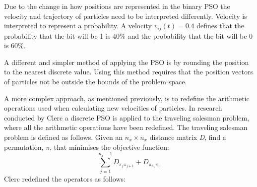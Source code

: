 Due to the change in how positions are represented in the binary \gls{PSO} the velocity and trajectory of particles need to be interpreted differently\cite{CompuIntelligenceIntro,FundamentalSwarm}. Velocity is interpreted to represent a probability. A velocity $v_{ij}(t)= 0.4$ defines that the probability that the bit will be 1 is 40\% and the probability that the bit will be 0 is 60\%\cite{CompuIntelligenceIntro,FundamentalSwarm}.

A different and simpler method of applying the \gls{PSO} is by rounding the position to the nearest discrete value\cite{CompuIntelligenceIntro,FundamentalSwarm}. Using this method requires that the position vectors of particles not be outside the bounds of the problem space\cite{CompuIntelligenceIntro,FundamentalSwarm}.

A more complex approach, as mentioned previously, is to redefine the arithmetic operations used when calculating new velocities of particles. In research conducted by Clerc a discrete PSO is applied to the traveling salesman problem, where all the arithmetic operations have been redefined\cite{CompuIntelligenceIntro,FundamentalSwarm}. The traveling salesman problem is defined as follows. Given an $n_x \times n_x$ distance matrix \emph{D}, find a permutation, $\pi$, that minimises the objective function:
\begin{equation}
    \sum^{n_x -1}_{j=1} D_{\pi_j\pi_{j+1}} + D_{\pi_{n_x}\pi_1}
\end{equation}
Clerc redefined the operators as follows:
